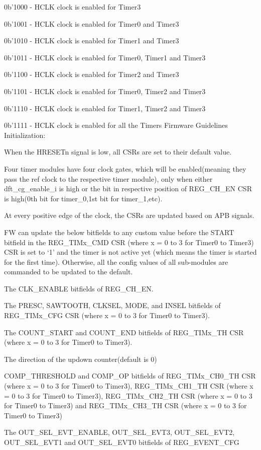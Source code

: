 0b’1000 - HCLK clock is enabled for Timer3

0b’1001 - HCLK clock is enabled for Timer0 and Timer3

0b’1010 - HCLK clock is enabled for Timer1 and Timer3

0b’1011 - HCLK clock is enabled for Timer0, Timer1 and Timer3

0b’1100 - HCLK clock is enabled for Timer2 and Timer3

0b’1101 - HCLK clock is enabled for Timer0, Timer2 and Timer3

0b’1110 - HCLK clock is enabled for Timer1, Timer2 and Timer3

0b’1111 - HCLK clock is enabled for all the Timers
Firmware Guidelines
Initialization:

    When the HRESETn signal is low, all CSRs are set to their default value.

    Four timer modules have four clock gates, which will be enabled(meaning they pass the ref clock to the respective timer module), only when either dft_cg_enable_i is high or the bit in respective position of REG_CH_EN CSR is high(0th bit for timer_0,1st bit for timer_1,etc).

    At every positive edge of the clock, the CSRs are updated based on APB signals.

    FW can update the below bitfields to any custom value before the START bitfield in the REG_TIMx_CMD CSR (where x = 0 to 3 for Timer0 to Timer3) CSR is set to ‘1’ and the timer is not active yet (which means the timer is started for the first time). Otherwise, all the config values of all sub-modules are commanded to be updated to the default.

        The CLK_ENABLE bitfields of REG_CH_EN.

        The PRESC, SAWTOOTH, CLKSEL, MODE, and INSEL bitfields of REG_TIMx_CFG CSR (where x = 0 to 3 for Timer0 to Timer3).

        The COUNT_START and COUNT_END bitfields of REG_TIMx_TH CSR (where x = 0 to 3 for Timer0 to Timer3).

        The direction of the updown counter(default is 0)

        COMP_THRESHOLD and COMP_OP bitfields of REG_TIMx_CH0_TH CSR (where x = 0 to 3 for Timer0 to Timer3), REG_TIMx_CH1_TH CSR (where x = 0 to 3 for Timer0 to Timer3), REG_TIMx_CH2_TH CSR (where x = 0 to 3 for Timer0 to Timer3) and REG_TIMx_CH3_TH CSR (where x = 0 to 3 for Timer0 to Timer3)

        The OUT_SEL_EVT_ENABLE, OUT_SEL_EVT3, OUT_SEL_EVT2, OUT_SEL_EVT1 and OUT_SEL_EVT0 bitfields of REG_EVENT_CFG

